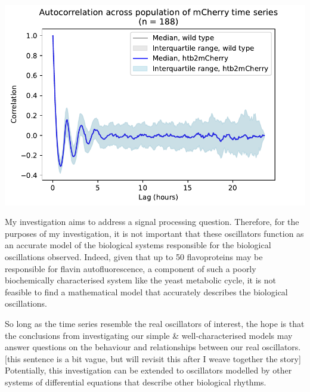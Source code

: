 \begin{enumerate}
\begin{enumerate}
\begin{center}
\includegraphics[width=.9\linewidth]{htb2mCherry_26643_plots_mCh_06.png}
\end{center}
\end{enumerate}
\end{enumerate}


My investigation aims to address a signal processing question.  Therefore, for the purposes of my investigation, it is not important that these oscillators function as an accurate model of the biological systems responsible for the biological oscillations observed.  Indeed, given that up to 50 flavoproteins may be responsible for flavin autofluorescence, a component of such a poorly biochemically characterised system like the yeast metabolic cycle, it is not feasible to find a mathematical model that accurately describes the biological oscillations.

So long as the time series resemble the real oscillators of interest, the hope is that the conclusions from investigating our simple \& well-characterised models may answer questions on the behaviour and relationships between our real oscillators. [this sentence is a bit vague, but will revisit this after I weave together the story]  Potentially, this investigation can be extended to oscillators modelled by other systems of differential equations that describe other biological rhythms.
